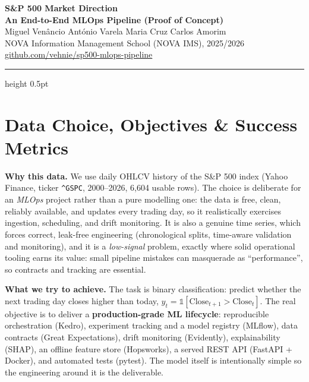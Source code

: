 \documentclass[12pt]{article}
\newcommand{\boldparagraph}[1]{\textbf{#1}\hspace{5pt}}
\begin{document}
\thispagestyle{empty}
\begin{center}
    \vspace*{-0.6cm}
    {\LARGE \textbf{S\&P 500 Market Direction}}\\[1pt]
    {\large \textbf{An End-to-End MLOps Pipeline (Proof of Concept)}}\\[5pt]
    {\small
    Miguel Ven\^ancio \quad Ant\'onio Varela \quad Maria Cruz \quad Carlos Amorim}\\[2pt]
    {\footnotesize NOVA Information Management School (NOVA IMS), 2025/2026 \;\textbullet\;
    \href{https://github.com/vehnie/sp500-mlops-pipeline}{github.com/vehnie/sp500-mlops-pipeline}}
\end{center}
\vspace{2pt}
\hrule height 0.5pt
\vspace{5pt}

\section{Data Choice, Objectives \& Success Metrics}

\boldparagraph{Why this data.} We use daily OHLCV history of the S\&P 500 index (Yahoo Finance, ticker \texttt{\^{}GSPC}, 2000--2026, 6{,}604 usable rows). The choice is deliberate for an \textit{MLOps} project rather than a pure modelling one: the data is free, clean, reliably available, and updates every trading day, so it realistically exercises ingestion, scheduling, and drift monitoring. It is also a genuine time series, which forces correct, leak-free engineering (chronological splits, time-aware validation and monitoring), and it is a \textit{low-signal} problem, exactly where solid operational tooling earns its value: small pipeline mistakes can masquerade as ``performance'', so contracts and tracking are essential.

\boldparagraph{What we try to achieve.} The task is binary classification: predict whether the next trading day closes higher than today, $y_t = \mathbb{1}[\text{Close}_{t+1} > \text{Close}_t]$. The real objective is to deliver a \textbf{production-grade ML lifecycle}: reproducible orchestration (Kedro), experiment tracking and a model registry (MLflow), data contracts (Great Expectations), drift monitoring (Evidently), explainability (SHAP), an offline feature store (Hopsworks), a served REST API (FastAPI + Docker), and automated tests (pytest). The model itself is intentionally simple so the engineering around it is the deliverable.
\end{document}
